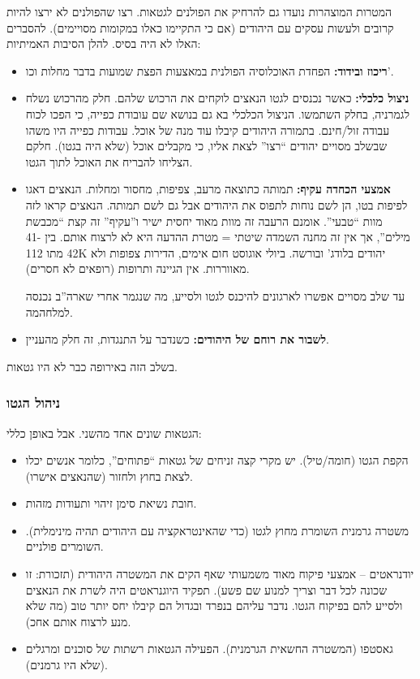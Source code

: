 \documentclass[]{article}
\begin{document}
    המטרות המוצהרות נועדו גם להרחיק את הפולנים לגטאות. רצו שהפולנים לא ירצו להיות קרובים ולעשות עסקים עם היהודים (אם כי התקיימו כאלו במקומות מסויימים). להסברים האלו לא היה בסיס. להלן הסיבות האמיתיות: 
    \begin{itemize}
        \item \textbf{ריכוז ובידוד: }הפחדת האוכלוסיה הפולנית במאצעות הפצת שמועות בדבר מחלות וכו'. 
        \item \textbf{ניצול כלכלי:} כאשר נכנסים לגטו הנאצים לוקחים את הרכוש שלהם. חלק מהרכוש נשלח לגמרניה, בחלק השתמשו. הניצול הכלכלי בא גם בנושא שם עובודת כפייה, כי הפכו לכוח עבודה זול/חינם. בתמורה היהודים קיבלו עוד מנה של אוכל. עבודות כפייה היו משהו שבשלב מסויים יהודים ``רצו'' לצאת אליו, כי מקבלים אוכל (שלא היה בגטו). חלקם הצליחו להבריח את האוכל לתוך הגטו. 
        \item \textbf{אמצעי הכחדה עקיף: }תמותה כתוצאה מרעב, צפיפות, מחסור ומחלות. הנאצים דאגו לפיפות בטו, הן לשם נוחות לתפוס את היהודים אבל גם לשם תמותה. הנאצים קראו לזה מוות ``טבעי''. אומנם הרעבה זה מוות מאוד יחסית ישיר ו''עקיף'' זה קצת ``מכבשת מילים'', אך אין זה מחנה השמדה שיטתי = מטרת ההדעה היא לא לרצוח אותם. בין 41-42 מתו 112K יהודים בלודג' ובורשה. ביולי אוגוסט חום אימים, הדירות צפופות ולא מאווררות. אין הגיינה ותרופות (רופאים לא חסרים). 
        
        עד שלב מסויים אפשרו לארגונים להיכנס לגטו ולסייע, מה שנגמר אחרי שארה''ב נכנסה למלחהמה. 
        \item \textbf{לשבור את רוחם של היהודים: }כשנדבר על התנגדות, זה חלק מהעניין. 
    \end{itemize}
    
    
    בשלב הזה באירופה כבר לא היו גטאות. 
    
    \subsubsection{ניהול הגטו}
    הגטאות שונים אחד מהשני. אבל באופן כללי: 
    \begin{itemize}
        \item הקפת הגטו (חומה/טיל). יש מקרי קצה זניחים של גטאות ``פתוחים'', כלומר אנשים יכלו לצאת בחוץ ולחזור (שהנאצים אישרו). 
        \item חובת נשיאת סימן זיהוי ותעודות מזהות. 
        \item משטרה גרמנית השומרת מחוץ לגטו (כדי שהאינטראקציה עם היהודים תהיה מינימלית). השומרים פולניים. 
        \item יודנראטים – אמצעי פיקוח מאוד משמעותי שאף הקים את המשטרה היהודית (תזכורת: זו שכונה לכל דבר וצריך למנוע שם פשע). תפקיד היוגנראטים היה לשרת את הנאצים ולסייע להם בפיקוח הגטו. נדבר עליהם בנפרד ובגדול הם קיבלו יחס יותר טוב (מה שלא מנע לרצוח אותם אחכ). 
        \item גאסטפו (המשטרה החשאית הגרמנית). הפעילה הגטאות רשתות של סוכנים ומרגלים (שלא היו גרמנים). 
    \end{itemize}
    
\end{document}
